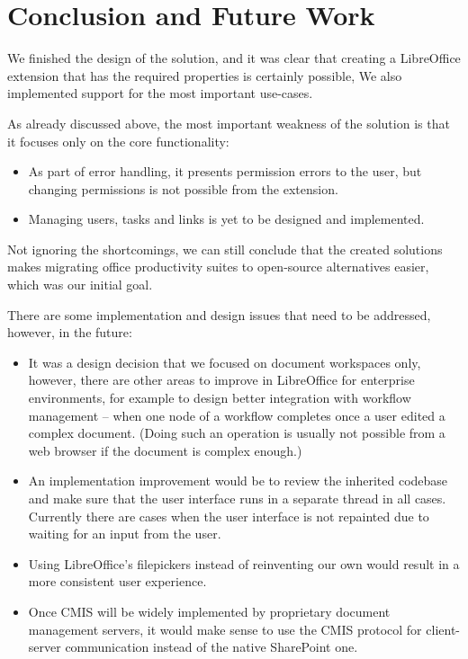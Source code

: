 \section{Conclusion and Future Work}

We finished the design of the solution, and it was clear that creating a
LibreOffice extension that has the required properties is certainly possible,
We also implemented support for the most important use-cases.

As already discussed above, the most important weakness of the solution is that
it focuses only on the core functionality:

\begin{itemize}
\item As part of error handling, it presents permission errors to the user, but
changing permissions is not possible from the extension.
\item Managing users, tasks and links is yet to be designed and implemented.
\end{itemize}

Not ignoring the shortcomings, we can still conclude that the created solutions
makes migrating office productivity suites to open-source alternatives easier,
which was our initial goal.

There are some implementation and design issues that need to be addressed,
however, in the future:

\begin{itemize}
\item It was a design decision that we focused on document workspaces only,
however, there are other areas to improve in LibreOffice for enterprise
environments, for example to design better integration with workflow management
-- when one node of a workflow completes once a user edited a complex document.
(Doing such an operation is usually not possible from a web browser if the
document is complex enough.)
\item An implementation improvement would be to review the inherited codebase
and make sure that the user interface runs in a separate thread in all cases.
Currently there are cases when the user interface is not repainted due to
waiting for an input from the user.
\item Using LibreOffice's filepickers instead of reinventing our own would
result in a more consistent user experience.
\item Once CMIS will be widely implemented by proprietary document management
servers, it would make sense to use the CMIS protocol for client-server
communication instead of the native SharePoint one.
\end{itemize}
